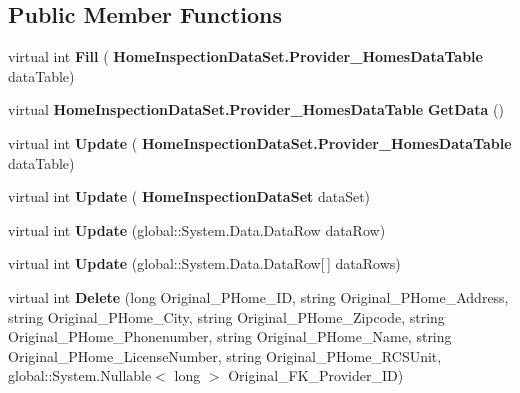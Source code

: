 \subsection*{Public Member Functions}
\begin{DoxyCompactItemize}
\item 
\mbox{\label{class_a_f_h___scheduler_1_1_home_inspection_data_set_table_adapters_1_1_provider___homes_table_adapter_a527e90f440031050eec917c454b06a72}} 
virtual int {\bfseries Fill} (\textbf{ Home\+Inspection\+Data\+Set.\+Provider\+\_\+\+Homes\+Data\+Table} data\+Table)
\item 
\mbox{\label{class_a_f_h___scheduler_1_1_home_inspection_data_set_table_adapters_1_1_provider___homes_table_adapter_a9dd742e0fc9cbd8c05ef3d1a22c3788a}} 
virtual \textbf{ Home\+Inspection\+Data\+Set.\+Provider\+\_\+\+Homes\+Data\+Table} {\bfseries Get\+Data} ()
\item 
\mbox{\label{class_a_f_h___scheduler_1_1_home_inspection_data_set_table_adapters_1_1_provider___homes_table_adapter_a51510fe1cb1c15f9c195fe4a5b66f1c1}} 
virtual int {\bfseries Update} (\textbf{ Home\+Inspection\+Data\+Set.\+Provider\+\_\+\+Homes\+Data\+Table} data\+Table)
\item 
\mbox{\label{class_a_f_h___scheduler_1_1_home_inspection_data_set_table_adapters_1_1_provider___homes_table_adapter_a00efc2facf56e696648a2ac6cd813160}} 
virtual int {\bfseries Update} (\textbf{ Home\+Inspection\+Data\+Set} data\+Set)
\item 
\mbox{\label{class_a_f_h___scheduler_1_1_home_inspection_data_set_table_adapters_1_1_provider___homes_table_adapter_aac5b6473091bfe57670403bf9167e06b}} 
virtual int {\bfseries Update} (global\+::\+System.\+Data.\+Data\+Row data\+Row)
\item 
\mbox{\label{class_a_f_h___scheduler_1_1_home_inspection_data_set_table_adapters_1_1_provider___homes_table_adapter_adbf715b9f53637179c5e3c8f873e3077}} 
virtual int {\bfseries Update} (global\+::\+System.\+Data.\+Data\+Row[$\,$] data\+Rows)
\item 
\mbox{\label{class_a_f_h___scheduler_1_1_home_inspection_data_set_table_adapters_1_1_provider___homes_table_adapter_afdaf4e2216e448f1de8e5ba3cc64651c}} 
virtual int {\bfseries Delete} (long Original\+\_\+\+P\+Home\+\_\+\+ID, string Original\+\_\+\+P\+Home\+\_\+\+Address, string Original\+\_\+\+P\+Home\+\_\+\+City, string Original\+\_\+\+P\+Home\+\_\+\+Zipcode, string Original\+\_\+\+P\+Home\+\_\+\+Phonenumber, string Original\+\_\+\+P\+Home\+\_\+\+Name, string Original\+\_\+\+P\+Home\+\_\+\+License\+Number, string Original\+\_\+\+P\+Home\+\_\+\+R\+C\+S\+Unit, global\+::\+System.\+Nullable$<$ long $>$ Original\+\_\+\+F\+K\+\_\+\+Provider\+\_\+\+ID)

\end{DoxyCompactItemize}
